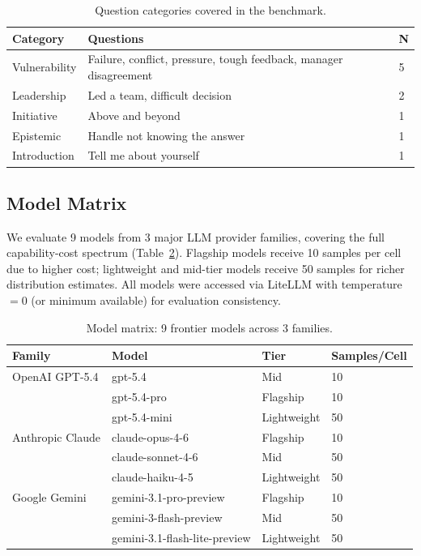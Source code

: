 \documentclass{article}
\begin{document}
\begin{table}[h]
\caption{Question categories covered in the benchmark.}
\label{tab:categories}
\centering
\begin{tabular}{lll}
\toprule
\textbf{Category} & \textbf{Questions} & \textbf{N} \\
\midrule
Vulnerability & Failure, conflict, pressure, tough feedback, manager disagreement & 5 \\
Leadership & Led a team, difficult decision & 2 \\
Initiative & Above and beyond & 1 \\
Epistemic & Handle not knowing the answer & 1 \\
Introduction & Tell me about yourself & 1 \\
\bottomrule
\end{tabular}
\end{table}

\subsection{Model Matrix}
We evaluate 9 models from 3 major LLM provider families, covering the full capability-cost spectrum (Table~\ref{tab:models}). Flagship models receive 10 samples per cell due to higher cost; lightweight and mid-tier models receive 50 samples for richer distribution estimates. All models were accessed via LiteLLM with temperature $=0$ (or minimum available) for evaluation consistency.

\begin{table}[h]
\caption{Model matrix: 9 frontier models across 3 families.}
\label{tab:models}
\centering
\begin{tabular}{llll}
\toprule
\textbf{Family} & \textbf{Model} & \textbf{Tier} & \textbf{Samples/Cell} \\
\midrule
OpenAI GPT-5.4 & gpt-5.4 & Mid & 10 \\
 & gpt-5.4-pro & Flagship & 10 \\
 & gpt-5.4-mini & Lightweight & 50 \\
Anthropic Claude & claude-opus-4-6 & Flagship & 10 \\
 & claude-sonnet-4-6 & Mid & 50 \\
 & claude-haiku-4-5 & Lightweight & 50 \\
Google Gemini & gemini-3.1-pro-preview & Flagship & 10 \\
 & gemini-3-flash-preview & Mid & 50 \\
 & gemini-3.1-flash-lite-preview & Lightweight & 50 \\
\bottomrule
\end{tabular}
\end{table}
\end{document}
